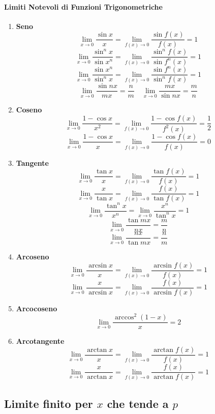 \documentclass{article}
\theoremstyle{plain}
\theoremstyle{definition}
\theoremstyle{remark}
\begin{document}
\vspace{10pt}

\paragraph{Limiti Notevoli di Funzioni Trigonometriche}
\begin{multicols}{2}
\begin{enumerate}
    \item[] \textbf{Seno}
    \[\lim_{x\to0}\dfrac{\sin x}{x}=\lim_{f(x)\to0}\dfrac{\sin f(x)}{f(x)}=1\]
    \[\lim_{x\to0}\dfrac{\sin^n x}{\sin x^n}=\lim_{f(x)\to0}\dfrac{\sin^n f(x)}{\sin f^n(x)}=1\]
    \[\lim_{x\to0}\dfrac{\sin x^n}{\sin^n x}=\lim_{f(x)\to0}\dfrac{\sin f^n(x)}{\sin^n f(x)}=1\]
    \[\lim_{x\to0}\dfrac{\sin nx}{mx}=\dfrac{n}{m}\quad\lim_{x\to0}\dfrac{mx}{\sin nx}=\dfrac{m}{n}\] 
    \item[] \textbf{Coseno}
    \[\lim_{x\to0}\dfrac{1-\cos x}{x^2}=\lim_{f(x)\to0}\dfrac{1-\cos f(x)}{f^2(x)}=\dfrac{1}{2}\]
    \[\lim_{x\to0}\dfrac{1-\cos x}{x}=\lim_{f(x)\to0}\dfrac{1-\cos f(x)}{f(x)}=0\]
    \item[] \textbf{Tangente}
    \[\lim_{x\to0}\dfrac{\tan x}{x}=\lim_{f(x)\to0}\dfrac{\tan f(x)}{f(x)}=1\]
    \[\lim_{x\to0}\dfrac{x}{\tan x}=\lim_{f(x)\to0}\dfrac{f(x)}{\tan f(x)}=1\]
    \[\lim_{x\to0}\dfrac{\tan^n x}{x^n}=\lim_{x\to0}\dfrac{x^n}{\tan^n x}=1\]
    \[\lim_{x\to0}\dfrac{\tan mx}{nx}=\dfrac{m}{n}\] 
    \[\lim_{x\to0}\dfrac{nx}{\tan mx}=\dfrac{n}{m}\] 
    \item[] \textbf{Arcoseno}
    \[\lim_{x\to0}\frac{\arcsin x}{x}=\lim_{f(x)\to0}\frac{\arcsin f(x)}{f(x)}=1\]
    \[\lim_{x\to0}\frac{x}{\arcsin x}=\lim_{f(x)\to0}\frac{f(x)}{\arcsin f(x)}=1\]
    \item[] \textbf{Arcocoseno}
    \[\lim_{x\to0}\frac{\arccos^2(1-x)}{x}=2\]
    \item[] \textbf{Arcotangente}
    \[\lim_{x\to0}\frac{\arctan x}{x}=\lim_{f(x)\to0}\frac{\arctan f(x)}{f(x)}=1\]
    \[\lim_{x\to0}\frac{x}{\arctan x}=\lim_{f(x)\to0}\frac{f(x)}{\arctan f(x)}=1\]
\end{enumerate}
\end{multicols}

\vspace{50pt}

\subsection{Limite finito per $x$ che tende a $p$}
\end{document}
